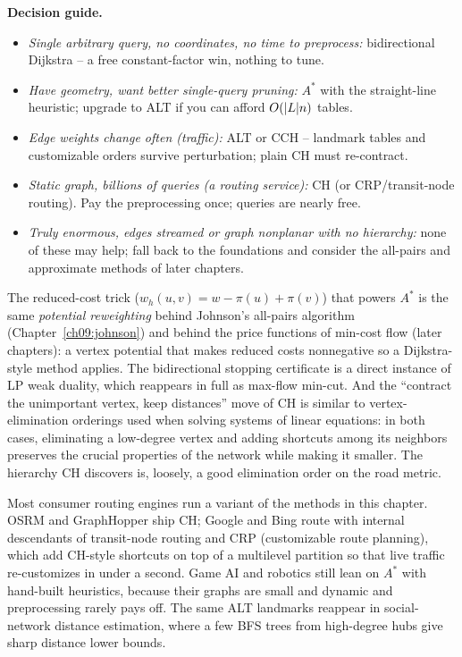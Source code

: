 \begin{focusbox}
\textbf{Decision guide.}
\begin{itemize}
  \item \emph{Single arbitrary query, no coordinates, no time to preprocess:}
        bidirectional Dijkstra -- a free constant-factor win, nothing to tune.
  \item \emph{Have geometry, want better single-query pruning:} $A^*$ with the
        straight-line heuristic; upgrade to ALT if you can afford
        $O(\lvert L\rvert n)$ tables.
  \item \emph{Edge weights change often (traffic):} ALT or CCH -- landmark tables
        and customizable orders survive perturbation; plain CH must re-contract.
  \item \emph{Static graph, billions of queries (a routing service):} CH (or
        CRP/transit-node routing). Pay the preprocessing once; queries are
        nearly free.
  \item \emph{Truly enormous, edges streamed or graph nonplanar with no
        hierarchy:} none of these may help; fall back to the foundations and
        consider the all-pairs and approximate methods of later chapters.
\end{itemize}
\end{focusbox}

\begin{connectionbox}
The reduced-cost trick ($w_h(u,v)=w-\pi(u)+\pi(v)$) that powers $A^*$ is the same
\emph{potential reweighting} behind Johnson's all-pairs algorithm
(Chapter~\ref{ch09:johnson}) and behind the price functions of
min-cost flow (later chapters): a vertex potential that makes reduced costs
nonnegative so a Dijkstra-style method applies. The bidirectional stopping
certificate is a direct instance of LP weak duality, which reappears in full as max-flow
min-cut. And the ``contract the unimportant vertex, keep distances'' move of CH
is similar to vertex-elimination orderings used when solving systems of linear equations: in both cases, eliminating a low-degree vertex and adding shortcuts among its neighbors preserves the crucial properties of the network while making it smaller. The
hierarchy CH discovers is, loosely, a good elimination order on the road metric.
\end{connectionbox}

\begin{applicationbox}
Most consumer routing engines run a variant of the methods in this chapter. OSRM
and GraphHopper ship CH; Google and Bing route with internal descendants of
transit-node routing and CRP (customizable route planning), which add CH-style
shortcuts on top of a multilevel partition so that live traffic re-customizes in
under a second. Game AI and robotics still lean on $A^*$ with hand-built
heuristics, because their graphs are small and dynamic and preprocessing rarely
pays off. The same ALT landmarks reappear in social-network distance estimation,
where a few BFS trees from high-degree hubs give sharp distance lower bounds.
\end{applicationbox}

